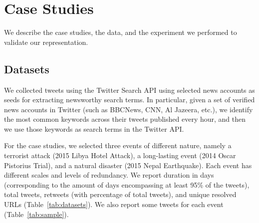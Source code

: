 


\section{Case Studies}
\label{sec:experimental}

We describe the case studies, the data, and the experiment we performed to
validate our representation.

\subsection{Datasets}

%
We collected tweets using the Twitter Search API using selected news accounts as
seeds for extracting newsworthy search terms.
%
In particular, given a set of verified news accounts in Twitter (such as
BBCNews, CNN, Al Jazeera, etc.), we identify the most common keywords across
their tweets published every hour, and then we use those keywords as search
terms in the Twitter API.


%
For the case studies, we selected three events of different nature, namely a
terrorist attack (2015 Libya Hotel Attack), a long-lasting event (2014 Oscar
Pistorius Trial), and a natural disaster (2015 Nepal Earthquake).
%
Each event has different scales and levels of redundancy. 
%
We report duration in days (corresponding to the amount of days encompassing at
least 95\% of the tweets), total tweets, retweets (with percentage of total
tweets), and unique resolved URLs (Table~\ref{tab:datasets}).
%
We also report some tweets for each event (Table~\ref{tab:sample}).


